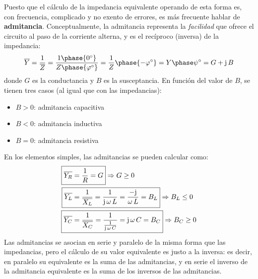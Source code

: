 Puesto que el cálculo de la impedancia equivalente operando de esta
forma es, con frecuencia, complicado y no exento de errores, es más
frecuente hablar de \textbf{admitancia}. Conceptualmente, la
admitancia representa la \textit{facilidad} que ofrece el circuito al
paso de la corriente alterna, y es el recíproco (inversa) de la
impedancia:
\begin{equation*}
  \overline{Y}=\dfrac{1}{\overline{Z}}=\dfrac{1\phase{0^\circ}}{Z\phase{\varphi^\circ}}=\dfrac{1}{Z}\phase{-\varphi^\circ}=Y\phase\psi^\circ=G+\mathrm{j}\,B
\end{equation*}
donde $G$ es la conductancia y $B$ es la susceptancia. En función del
valor de $B$, se tienen tres casos (al igual que con las impedancias):
\begin{itemize}
\item $B>0$: admitancia capacitiva
\item $B<0$: admitancia inductiva
\item $B=0$: admitancia resistiva
\end{itemize}
En los elementos simples, las admitancias se pueden calcular como:
\begin{align}
  \Aboxed{\overline{Y_R}&=\dfrac{1}{R}=G}\Rightarrow G\geq 0\\
  \Aboxed{\overline{Y_L}&=\dfrac{1}{\overline{X_L}}=\dfrac{1}{\mathrm{j}\,\omega\,L}=\dfrac{-\mathrm{j}}{\omega\,L}=B_L}\Rightarrow B_L\leq 0\\
  \Aboxed{\overline{Y_C}&=\dfrac{1}{\overline{X_C}}=\dfrac{1}{\frac{1}{\mathrm{j}\,\omega\,C}}=\mathrm{j}\,\omega\,C=B_C}\Rightarrow B_C\geq 0
\end{align}
Las admitancias se asocian en serie y paralelo de la misma forma que
las impedancias, pero el cálculo de su valor equivalente es justo a la
inversa: es decir, en paralelo su equivalente es la suma de las
admitancias, y en serie el inverso de la admitancia equivalente es la
suma de los inversos de las admitancias.
	
